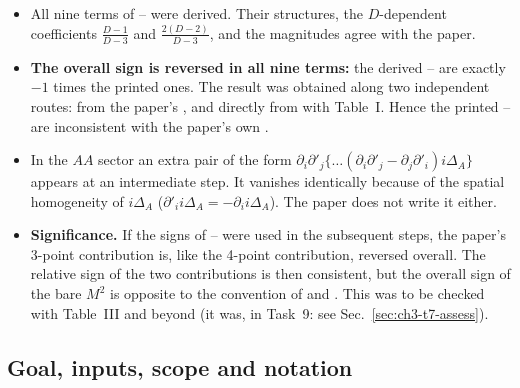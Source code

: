 \begin{discbox}
\begin{itemize}[leftmargin=12pt]
\item All nine terms of -- were derived. Their structures, the $D$-dependent coefficients $\tfrac{D-1}{D-3}$ and $\tfrac{2(D-2)}{D-3}$,
and the magnitudes agree with the paper.
\item \textbf{The overall sign is reversed in all nine terms:} the derived -- are exactly $-1$ times the printed ones.
The result was obtained along two independent routes: from the paper's , and directly from  with Table~I.
Hence the printed -- are inconsistent with the paper's own .
\item In the $AA$ sector an extra pair of the form $\partial_i\partial'_j\{\ldots(\partial_i\partial'_j-\partial_j\partial'_i)i\Delta_A\}$ appears at an intermediate step.
It vanishes identically because of the spatial homogeneity of $i\Delta_A$ ($\partial'_ii\Delta_A=-\partial_ii\Delta_A$). The paper does not write it either.
\item \textbf{Significance.} If the signs of -- were used in the subsequent steps, the paper's 3-point contribution is, like the
4-point contribution, reversed overall. The relative sign of the two contributions is then consistent, but the overall sign of the bare $M^2$ is
opposite to the convention of  and . This was to be checked with Table~III and beyond (it was, in Task~9: see Sec.~\ref{sec:ch3-t7-assess}).
\end{itemize}
\end{discbox}

\subsection{Goal, inputs, scope and notation}

